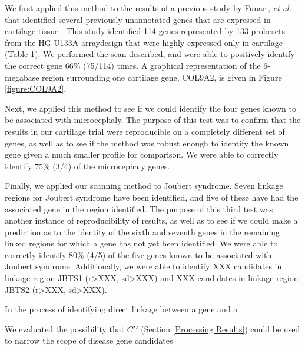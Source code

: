 \documentclass{article}
\begin{document}
We first applied this method to the results of a previous study by Funari,
\emph{et al.} that identified several previously unannotated genes that are
expressed in cartilage tissue \cite{funari}.  This study identified 114 genes
represented by 133 probesets from the HG-U133A arraydesign that were highly
expressed only in cartilage (Table 1).  We performed the scan described, and
were able to positively identify the correct gene 66\% (75/114) times.  A
graphical representation of the 6-megabase region surrounding one cartilage
gene, COL9A2, is given in Figure \ref{figure:COL9A2}.

Next, we applied this method to see if we could identify the four genes known to
be associated with microcephaly.  The purpose of this test was to confirm that
the results in our cartilage trial were reproducible on a completely different
set of genes, as well as to see if the method was robust enough to identify the
known gene given a much smaller profile for comparison.  We were able to
correctly identify 75\% (3/4) of the microcephaly genes.

Finally, we applied our scanning method to Joubert syndrome.  Seven linkage
regions for Joubert syndrome have been identified, and five of these have had
the associated gene in the region identified.  The purpose of this third test
was another instance of reproducibility of results, as well as to see if we
could make a prediction as to the identity of the sixth and seventh genes in
the remaining linked regions for which a gene has not yet been identified.  We
were able to correctly identify 80\% (4/5) of the five genes known to be
associated with Joubert syndrome.  Additionally, we were able to identify XXX
candidates in linkage region JBTS1 (r>XXX, sd>XXX) and XXX candidates in
linkage region JBTS2 (r>XXX, sd>XXX).



In the process of identifying direct linkage between a gene and a 


We evaluated the possibility that $C\prime\prime$ (Section \ref{Processing
Results}) could be used to narrow the scope of disease gene candidates
\end{document}
